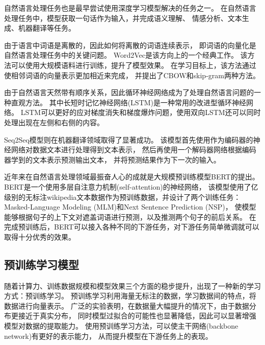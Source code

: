 自然语言处理任务也是最早尝试使用深度学习模型解决的任务之一。
在自然语言处理任务中，模型获取一句话作为输入，并完成语义理解、
情感分析、文本生成、机器翻译等任务。

由于语言中词语是离散的，因此如何将离散的词语连续表示，
即词语的向量化是自然语言处理任务中的关键问题。
Word2Vec\cite{mikolov2013efficient}是该方向上的一个经典工作。
该方法可以使用大规模语料进行训练，提升了模型效果。
在学习目标上，该方法通过使相邻词语的向量表示更加相近来完成，
并提出了CBOW和skip-gram两种方法。

由于自然语言天然带有顺序关系，因此循环神经网络成为了处理自然语言问题的一种直观方法。
其中长短时记忆神经网络(LSTM)\cite{hochreiter1997long}是一种常用的改进型循环神经网络。
LSTM可以更好的应对梯度消失和梯度爆炸问题，使用双向LSTM还可以同时处理出现在左侧和右侧的内容。

Seq2Seq模型\cite{sutskever2014sequence}则在机器翻译领域取得了显著成功。
该模型首先使用作为编码器的神经网络对数据文本进行处理得到文本表示，
然后再使用一个解码器网络根据编码器学到的文本表示预测输出文本，
并将预测结果作为下一次的输入。

近年来在自然语言处理领域最振奋人心的成就是大规模预训练模型BERT\cite{devlin2019bert}的提出。
BERT是一个使用多层自注意力机制(self-attention)\cite{vaswani2017attention}的神经网络，
该模型使用了亿级别的无标注wikipedia文本数据作为预训练数据，并设计了两个训练任务：
Masked-Language Modeling (MLM)和Next Sentence Prediction (NSP)，
使模型能够根据句子的上下文对遮盖词语进行预测，以及推测两个句子的前后关系。
在完成预训练后，BERT可以接入各种不同的下游任务，对下游任务简单微调就可以取得十分优秀的效果。



\subsection{预训练学习模型}

随着计算力、训练数据规模和模型效果三个方面的稳步提升，出现了一种新的学习方式：预训练学习。
预训练学习利用海量无标注的数据，学习数据间的特点，将数据进行向量表示。
广泛的实验表明，在数据量大幅提升的情况下，由于数据分布更接近于真实分布，
同时模型过拟合的可能性也显著降低，因此可以显著增强模型对数据的提取能力。
使用预训练学习方法，可以使主干网络(backbone network)有更好的表示能力，
从而提升模型在下游任务上的表现。